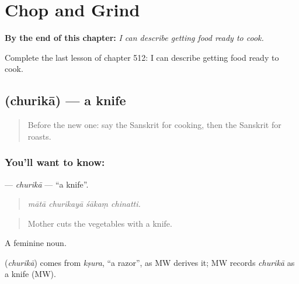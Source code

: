 
\chapter{Chop and Grind}
\label{ch:sa-chop-and-grind}

\begin{chapteropening}
\textbf{By the end of this chapter:} \emph{I can describe getting food ready to cook.}

Complete the last lesson of chapter 512: I can describe getting food ready to cook.
\end{chapteropening}

\section[\texorpdfstring{\sk{छुरिका} (churikā)}{छुरिका (churikā)}]{ (churikā) — a knife}

\label{lesson:SA-C512-churika}



\begin{quote}
Before the new one: say the Sanskrit for cooking, then the Sanskrit for roasts.
\end{quote}

\subsection*{You'll want to know: }
\textbf{} — \emph{churikā} — \textquotedblleft{}a knife\textquotedblright{}.

\begin{quote}
   
\end{quote}

\begin{quote}
\emph{mātā churikayā śākaṃ chinatti.}
\end{quote}

\begin{quote}
Mother cuts the vegetables with a knife.
\end{quote}

A feminine noun.

\begin{cousinweb}
\textbf{} (\emph{churikā}) comes from \emph{kṣura}, \textquotedblleft{}a razor\textquotedblright{}, as MW derives it; MW records \emph{churikā} as a knife (MW).
\end{cousinweb}

